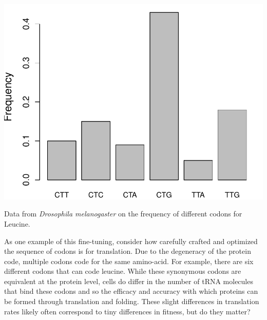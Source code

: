 {\begin{marginfigure}
\begin{center}
\includegraphics[width=\textwidth]{Journal_figs/drift_selection/Codon_bias_Drosophila/Leucine_codon_bias.pdf}
\end{center}
\caption{Data from {\it Drosophila melanogaster} on the frequency of
  different codons for Leucine.} \label{fig:Leucine}
\end{marginfigure}
As one example of this fine-tuning, consider how carefully crafted and optimized the sequence of codons is for translation. Due to the degeneracy of the protein code, multiple codons code for the same
amino-acid. For example, there are six different codons that can code
leucine. While these synonymous codons are equivalent at the protein
level, cells do differ in the number of tRNA molecules that bind
these codons and so the efficacy and accuracy with which proteins can be formed through
translation and folding.  These slight differences in translation rates
likely often correspond to tiny differences in fitness, but do they
matter?

}
